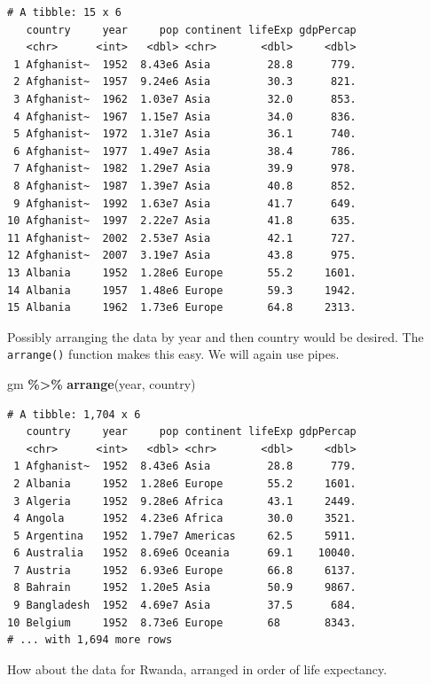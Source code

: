 \documentclass[
]{krantz}
\makeatletter
\newenvironment{Shaded}{\begin{snugshade}}{\end{snugshade}}
\newcommand{\KeywordTok}[1]{\textcolor[rgb]{0.27,0.27,0.27}{\textbf{#1}}}
\newcommand{\NormalTok}[1]{#1}
\newcommand{\OperatorTok}[1]{\textcolor[rgb]{0.43,0.43,0.43}{\textbf{#1}}}
\newcommand{\StringTok}[1]{\textcolor[rgb]{0.5,0.5,0.5}{#1}}
\newenvironment{kframe}{%
\medskip{}
\setlength{\fboxsep}{.8em}
 \def\at@end@of@kframe{}%
 \ifinner\ifhmode%
  \def\at@end@of@kframe{\end{minipage}}%
  \begin{minipage}{\columnwidth}%
 \fi\fi%
 \def\FrameCommand##1{\hskip\@totalleftmargin \hskip-\fboxsep
 \colorbox{shadecolor}{##1}\hskip-\fboxsep
     \hskip-\linewidth \hskip-\@totalleftmargin \hskip\columnwidth}%
 \MakeFramed {\advance\hsize-\width
   \@totalleftmargin\z@ \linewidth\hsize
   \@setminipage}}%
 {\par\unskip\endMakeFramed%
 \at@end@of@kframe}
\renewenvironment{Shaded}{\begin{kframe}}{\end{kframe}}
\makeatother
\begin{document}
\begin{verbatim}
# A tibble: 15 x 6
   country     year     pop continent lifeExp gdpPercap
   <chr>      <int>   <dbl> <chr>       <dbl>     <dbl>
 1 Afghanist~  1952  8.43e6 Asia         28.8      779.
 2 Afghanist~  1957  9.24e6 Asia         30.3      821.
 3 Afghanist~  1962  1.03e7 Asia         32.0      853.
 4 Afghanist~  1967  1.15e7 Asia         34.0      836.
 5 Afghanist~  1972  1.31e7 Asia         36.1      740.
 6 Afghanist~  1977  1.49e7 Asia         38.4      786.
 7 Afghanist~  1982  1.29e7 Asia         39.9      978.
 8 Afghanist~  1987  1.39e7 Asia         40.8      852.
 9 Afghanist~  1992  1.63e7 Asia         41.7      649.
10 Afghanist~  1997  2.22e7 Asia         41.8      635.
11 Afghanist~  2002  2.53e7 Asia         42.1      727.
12 Afghanist~  2007  3.19e7 Asia         43.8      975.
13 Albania     1952  1.28e6 Europe       55.2     1601.
14 Albania     1957  1.48e6 Europe       59.3     1942.
15 Albania     1962  1.73e6 Europe       64.8     2313.
\end{verbatim}

Possibly arranging the data by year and then country would be desired. The \texttt{arrange()} function makes this easy. We will again use pipes.

\begin{Shaded}
\begin{Highlighting}[]
\NormalTok{gm }\OperatorTok{\%\textgreater{}\%}\StringTok{ }\KeywordTok{arrange}\NormalTok{(year, country)}
\end{Highlighting}
\end{Shaded}

\begin{verbatim}
# A tibble: 1,704 x 6
   country     year     pop continent lifeExp gdpPercap
   <chr>      <int>   <dbl> <chr>       <dbl>     <dbl>
 1 Afghanist~  1952  8.43e6 Asia         28.8      779.
 2 Albania     1952  1.28e6 Europe       55.2     1601.
 3 Algeria     1952  9.28e6 Africa       43.1     2449.
 4 Angola      1952  4.23e6 Africa       30.0     3521.
 5 Argentina   1952  1.79e7 Americas     62.5     5911.
 6 Australia   1952  8.69e6 Oceania      69.1    10040.
 7 Austria     1952  6.93e6 Europe       66.8     6137.
 8 Bahrain     1952  1.20e5 Asia         50.9     9867.
 9 Bangladesh  1952  4.69e7 Asia         37.5      684.
10 Belgium     1952  8.73e6 Europe       68       8343.
# ... with 1,694 more rows
\end{verbatim}

How about the data for Rwanda, arranged in order of life expectancy.
\end{document}
